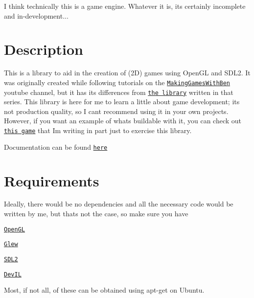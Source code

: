 I think technically this is a game engine. Whatever it is, it\textquotesingle{}s certainly incomplete and in-\/development...

\section*{Description}

This is a library to aid in the creation of (2D) games using Open\+GL and S\+D\+L2. It was originally created while following tutorials on the \href{https://www.youtube.com/channel/UCL5m1_llmeiAdZMo_ZanIvg}{\tt Making\+Games\+With\+Ben} youtube channel, but it has its differences from \href{https://github.com/Barnold1953/GraphicsTutorials}{\tt the library} written in that series. This library is here for me to learn a little about game development; it\textquotesingle{}s not production quality, so I can\textquotesingle{}t recommend using it in your own projects. However, if you want an example of what\textquotesingle{}s buildable with it, you can check out \href{https://github.com/NivenT/Planet}{\tt this game} that I\textquotesingle{}m writing in part just to exercise this library.

Documentation can be found \href{https://nivent.github.io/jubilant-funicular/html/index.html}{\tt here}

\section*{Requirements}

Ideally, there would be no dependencies and all the necessary code would be written by me, but that\textquotesingle{}s not the case, so make sure you have


\begin{DoxyItemize}
\item \href{https://www.opengl.org/}{\tt Open\+GL}
\item \href{http://glew.sourceforge.net/}{\tt Glew}
\item \href{https://www.libsdl.org/download-2.0.php}{\tt S\+D\+L2}
\item \href{http://openil.sourceforge.net/}{\tt Dev\+IL}
\end{DoxyItemize}

Most, if not all, of these can be obtained using {\ttfamily apt-\/get} on Ubuntu. 